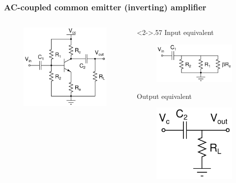 \documentclass[beamer]{standalone}
\begin{document}
\frame
{ \frametitle{AC-coupled common emitter (inverting) amplifier }
\begin{columns}[c]
 \begin{column}{.43\textwidth}
  \begin{figure}
   \includegraphics[height=0.50\textheight]{./schematics/npn_ac_common_emitter_amplifier}
  \end{figure}
 \end{column}
 \begin{column}<2->{.57\textwidth}
  \pause
  Input equivalent
  \begin{figure}
   \includegraphics[height=0.20\textheight]{./schematics/ac_coupled_input}
  \end{figure}

  \pause
  Output equivalent
  \begin{figure}
   \includegraphics[height=0.20\textheight]{./schematics/ac_coupled_output_inv_amplifier}
  \end{figure}


\end{column}
\end{columns}}
\end{document}
